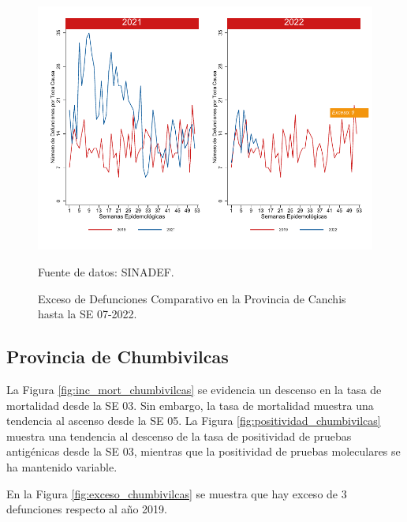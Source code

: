 \documentclass[12pt,a4paper,openany]{book}
\begin{document}
		\begin{figure}[h]
			\caption{Exceso de Defunciones Comparativo en la Provincia de Canchis hasta la SE 07-2022.}\label{fig:exceso_canchis}
			\begin{center}
				\includegraphics[width=0.7\linewidth]{../figuras/exceso_5.pdf}
			\end{center}
			{\footnotesize {Fuente de datos: SINADEF.}}
		\end{figure}
		
		\clearpage
		
		\subsection*{Provincia de Chumbivilcas}
		\noindent La Figura \ref{fig:inc_mort_chumbivilcas} se evidencia un descenso en la tasa de mortalidad desde la SE 03. Sin embargo, la tasa de mortalidad muestra una tendencia al ascenso desde la SE 05.   
		\noindent La Figura \ref{fig:positividad_chumbivilcas} muestra una tendencia al descenso de la tasa de positividad de pruebas antigénicas desde la SE 03, mientras que la positividad de pruebas moleculares se ha mantenido variable. 
		
		En la Figura \ref{fig:exceso_chumbivilcas} se muestra que hay exceso de 3 defunciones respecto al año 2019.
		
\end{document}
